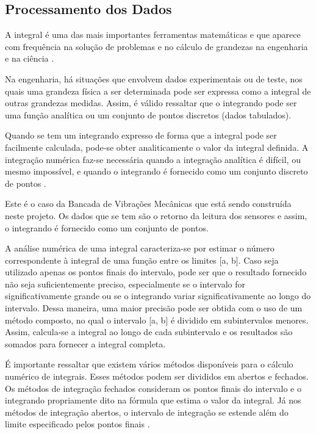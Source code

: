 \subsection*{\textbf{Processamento dos Dados}}

A integral é uma das mais importantes ferramentas matemáticas e que aparece com frequência na solução de problemas e no cálculo de grandezas na engenharia e na ciência \cite{metodos_numericos}.

Na engenharia, há situações que envolvem dados experimentais ou de teste, nos quais uma grandeza física a ser determinada pode ser expressa como a integral de outras grandezas medidas. Assim, é válido ressaltar que o integrando pode ser uma função analítica ou um conjunto de pontos discretos (dados tabulados).

Quando se tem um integrando expresso de forma que a integral pode ser facilmente calculada, pode-se obter analiticamente o valor da integral definida. A integração numérica faz-se necessária quando a integração analítica é difícil, ou mesmo impossível, e quando o integrando é fornecido como um conjunto discreto de pontos \cite{metodos_numericos}.

Este é o caso da Bancada de Vibrações Mecânicas que está sendo construída neste projeto. Os dados que se tem são o retorno da leitura dos sensores e assim, o integrando é fornecido como um conjunto de pontos.

A análise numérica de uma integral caracteriza-se por estimar  o número correspondente à integral de uma função entre os limites [a, b]. Caso seja utilizado apenas os pontos finais do intervalo, pode ser que o resultado fornecido não seja suficientemente preciso, especialmente se o intervalo for significativamente grande ou se o integrando variar significativamente ao longo do intervalo. Dessa maneira, uma maior precisão pode ser obtida com o uso de um método composto, no qual o intervalo [a, b] é dividido em subintervalos menores. Assim, calcula-se a integral ao longo de cada subintervalo e os resultados são somados para fornecer a integral completa.

É importante ressaltar que existem vários métodos disponíveis para o cálculo numérico de integrais. Esses métodos podem ser divididos em abertos e fechados. Os métodos de integração fechados consideram os pontos finais do intervalo e o integrando propriamente dito na fórmula que estima o valor da integral. Já nos métodos de integração abertos, o intervalo de integração se estende além do limite especificado pelos pontos finais \cite{metodos_numericos}.


